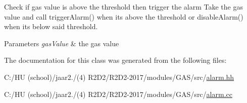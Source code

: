 Check if gas value is above the threshold then trigger the alarm Take the gas value and call trigger\+Alarm() when it\textquotesingle{}s above the threshold or disable\+Alarm() when it\textquotesingle{}s below said threshold. 


\begin{DoxyParams}{Parameters}
{\em gas\+Value} & the gas value \\
\hline
\end{DoxyParams}


The documentation for this class was generated from the following files\+:\begin{DoxyCompactItemize}
\item 
C\+:/\+H\+U (school)/jaar2./(4) R2\+D2/\+R2\+D2-\/2017/modules/\+G\+A\+S/src/\hyperlink{alarm_8hh}{alarm.\+hh}\item 
C\+:/\+H\+U (school)/jaar2./(4) R2\+D2/\+R2\+D2-\/2017/modules/\+G\+A\+S/src/\hyperlink{alarm_8cc}{alarm.\+cc}\end{DoxyCompactItemize}
